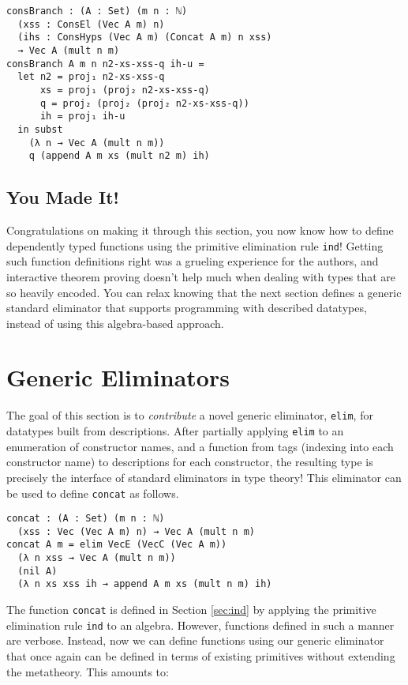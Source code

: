 \documentclass[preprint,nonatbib]{sigplanconf}
\newcommand{\refsec}[1]{Section \ref{sec:#1}}
\begin{document}
\begin{verbatim}
consBranch : (A : Set) (m n : ℕ)
  (xss : ConsEl (Vec A m) n)
  (ihs : ConsHyps (Vec A m) (Concat A m) n xss)
  → Vec A (mult n m)
consBranch A m n n2-xs-xss-q ih-u =
  let n2 = proj₁ n2-xs-xss-q
      xs = proj₁ (proj₂ n2-xs-xss-q)
      q = proj₂ (proj₂ (proj₂ n2-xs-xss-q))
      ih = proj₁ ih-u
  in subst
    (λ n → Vec A (mult n m))
    q (append A m xs (mult n2 m) ih)
\end{verbatim}

\subsection{You Made It!}

Congratulations on making it through this section, you now know how to define dependently typed
functions using the primitive elimination rule {\tt ind}!
Getting such function definitions right was a grueling experience for
the authors, and interactive theorem proving doesn't help much when
dealing with types that are so heavily encoded. You can relax knowing
that the next section defines a generic standard eliminator that supports
programming with described datatypes, instead of using this
algebra-based approach.

\section{Generic Eliminators}
\label{sec:elim}

The goal of this section is to {\it contribute} a novel generic
eliminator, {\tt elim}, for datatypes built from descriptions.
After partially applying {\tt elim} to an enumeration of constructor
names, and a function from tags (indexing into each constructor name)
to descriptions for each constructor, the resulting type is precisely
the interface of standard eliminators in type theory!  This eliminator can
be used to define {\tt concat} as follows.

\begin{verbatim}
concat : (A : Set) (m n : ℕ)
  (xss : Vec (Vec A m) n) → Vec A (mult n m)
concat A m = elim VecE (VecC (Vec A m))
  (λ n xss → Vec A (mult n m))
  (nil A)
  (λ n xs xss ih → append A m xs (mult n m) ih)
\end{verbatim}

The function {\tt concat} is defined in \refsec{ind} by applying the
primitive elimination rule {\tt ind} to an algebra. However,
functions defined in such a manner are verbose. Instead, now we
can define functions using our generic eliminator that once again can
be defined in terms of existing primitives without extending the
metatheory. This amounts to:
\end{document}
